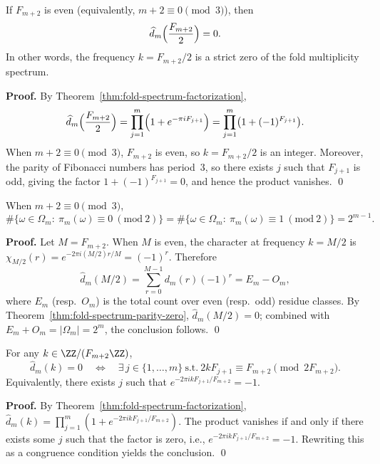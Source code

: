 \begin{theorem}
\label{thm:fold-spectrum-parity-zero}
If $F_{m+2}$ is even (equivalently, $m+2\equiv 0\pmod 3$), then
\[
\widehat d_m\Bigl(\frac{F_{m+2}}{2}\Bigr)=0.
\]
In other words, the frequency $k=F_{m+2}/2$ is a strict zero of the fold multiplicity spectrum.
\end{theorem}

\textbf{Proof.}
By Theorem~\ref{thm:fold-spectrum-factorization},
\[
\widehat d_m\Bigl(\frac{F_{m+2}}{2}\Bigr)=\prod_{j=1}^m\Bigl(1+e^{-\pi i F_{j+1}}\Bigr)
=\prod_{j=1}^m\bigl(1+(-1)^{F_{j+1}}\bigr).
\]
When $m+2\equiv 0\pmod 3$, $F_{m+2}$ is even, so $k=F_{m+2}/2$ is an integer. Moreover, the parity of Fibonacci numbers has period~3, so there exists $j$ such that $F_{j+1}$ is odd, giving the factor $1+(-1)^{F_{j+1}}=0$, and hence the product vanishes. \qed

\begin{corollary}\label{cor:fold-even-odd-balance}
When $m+2\equiv 0\pmod 3$,
\[
\#\{\omega\in\Omega_m:\ \pi_m(\omega)\equiv 0\ (\mathrm{mod}\ 2)\}
=
\#\{\omega\in\Omega_m:\ \pi_m(\omega)\equiv 1\ (\mathrm{mod}\ 2)\}
=2^{m-1}.
\]
\end{corollary}

\textbf{Proof.}
Let $M=F_{m+2}$. When $M$ is even, the character at frequency $k=M/2$ is
\(
\chi_{M/2}(r)=e^{-2\pi i (M/2)r/M}=(-1)^r
\).
Therefore
\[
\widehat d_m(M/2)=\sum_{r=0}^{M-1} d_m(r)(-1)^r
=E_m-O_m,
\]
where $E_m$ (resp.\ $O_m$) is the total count over even (resp.\ odd) residue classes. By Theorem~\ref{thm:fold-spectrum-parity-zero}, $\widehat d_m(M/2)=0$; combined with $E_m+O_m=|\Omega_m|=2^m$, the conclusion follows. \qed

\begin{theorem}
\label{thm:fold-spectrum-zero-criterion}
For any $k\in\ZZ/(F_{m+2}\ZZ)$,
\[
\widehat d_m(k)=0\quad\Longleftrightarrow\quad\exists\,j\in\{1,\dots,m\}\ \text{s.t.}\ 2kF_{j+1}\equiv F_{m+2}\pmod{2F_{m+2}}.
\]
Equivalently, there exists $j$ such that
\(
e^{-2\pi i k F_{j+1}/F_{m+2}}=-1
\).
\end{theorem}

\textbf{Proof.}
By Theorem~\ref{thm:fold-spectrum-factorization},
\(
\widehat d_m(k)=\prod_{j=1}^m(1+e^{-2\pi i k F_{j+1}/F_{m+2}})
\).
The product vanishes if and only if there exists some $j$ such that the factor is zero, i.e.,
\(
e^{-2\pi i k F_{j+1}/F_{m+2}}=-1
\).
Rewriting this as a congruence condition yields the conclusion. \qed

